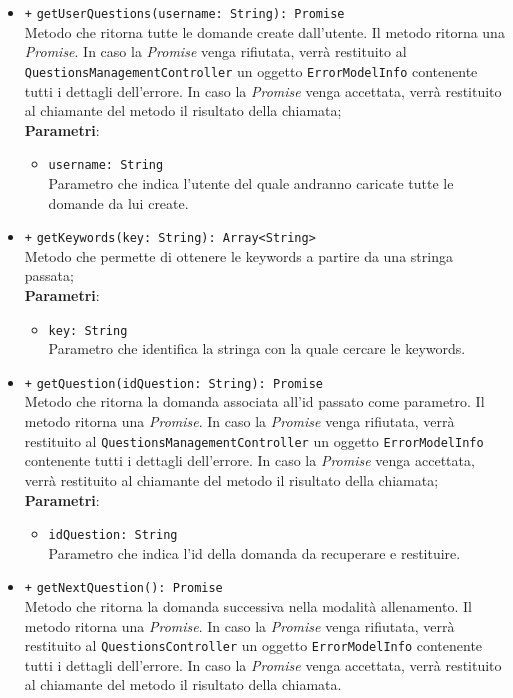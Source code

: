 \begin{itemize}
\begin{itemize}
		\item \texttt{+} \texttt{getUserQuestions(username: String): Promise} \\Metodo che ritorna tutte le domande create dall'utente. Il metodo ritorna una \textit{Promise}. In caso la \textit{Promise} venga rifiutata, verrà restituito al \\ \texttt{QuestionsManagementController} un oggetto \texttt{ErrorModelInfo} contenente tutti i dettagli dell'errore. In caso la \textit{Promise} venga accettata, verrà restituito al chiamante del metodo il risultato della chiamata;\\
		\textbf{Parametri}:
		\begin{itemize}
			\item \texttt{username: String} \\ Parametro che indica l'utente del quale andranno caricate tutte le domande da lui create.
		\end{itemize}
		\item \texttt{+} \texttt{getKeywords(key: String): Array<String>}\\ Metodo che permette di ottenere le keywords a partire da una stringa passata;\\
		\textbf{Parametri}:
		\begin{itemize}
			\item \texttt{key: String} \\ Parametro che identifica la stringa con la quale cercare le keywords.
		\end{itemize}
		\item \texttt{+} \texttt{getQuestion(idQuestion: String): Promise} \\ Metodo che ritorna la domanda associata all'id passato come parametro. Il metodo ritorna una \textit{Promise}. In caso la \textit{Promise} venga rifiutata, verrà restituito al \texttt{QuestionsManagementController} un oggetto \texttt{ErrorModelInfo} contenente tutti i dettagli dell'errore. In caso la \textit{Promise} venga accettata, verrà restituito al chiamante del metodo il risultato della chiamata;\\
		\textbf{Parametri}:
		\begin{itemize}
			\item \texttt{idQuestion: String} \\ Parametro che indica l'id della domanda da recuperare e restituire.
		\end{itemize}
		\item \texttt{+} \texttt{getNextQuestion(): Promise} \\ Metodo che ritorna la domanda successiva nella modalità allenamento. Il metodo ritorna una \textit{Promise}. In caso la \textit{Promise} venga rifiutata, verrà restituito al \texttt{QuestionsController} un oggetto \texttt{ErrorModelInfo} contenente tutti i dettagli dell'errore. In caso la \textit{Promise} venga accettata, verrà restituito al chiamante del metodo il risultato della chiamata.
	\end{itemize}
\end{itemize}